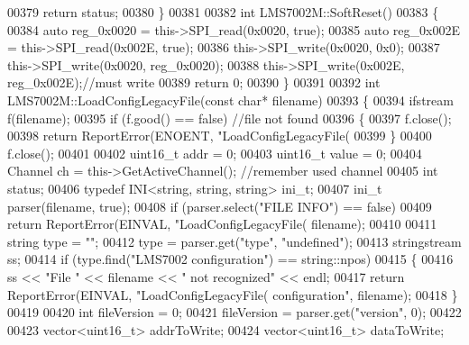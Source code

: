 \begin{DoxyCode}
00379     \textcolor{keywordflow}{return} status;
00380 \}
00381 
00382 \textcolor{keywordtype}{int} LMS7002M::SoftReset()
00383 \{
00384     \textcolor{keyword}{auto} reg\_0x0020 = this->SPI_read(0x0020, \textcolor{keyword}{true});
00385     \textcolor{keyword}{auto} reg\_0x002E = this->SPI_read(0x002E, \textcolor{keyword}{true});
00386     this->SPI_write(0x0020, 0x0);
00387     this->SPI_write(0x0020, reg\_0x0020);
00388     this->SPI_write(0x002E, reg\_0x002E);\textcolor{comment}{//must write}
00389     \textcolor{keywordflow}{return} 0;
00390 \}
00391 
00392 \textcolor{keywordtype}{int} LMS7002M::LoadConfigLegacyFile(\textcolor{keyword}{const} \textcolor{keywordtype}{char}* filename)
00393 \{
00394     ifstream f(filename);
00395     \textcolor{keywordflow}{if} (f.good() == \textcolor{keyword}{false}) \textcolor{comment}{//file not found}
00396     \{
00397         f.close();
00398         \textcolor{keywordflow}{return} ReportError(ENOENT, \textcolor{stringliteral}{"LoadConfigLegacyFile(%
00399     \}
00400     f.close();
00401 
00402     uint16\_t addr = 0;
00403     uint16\_t value = 0;
00404     Channel ch = this->GetActiveChannel(); \textcolor{comment}{//remember used channel}
00405     \textcolor{keywordtype}{int} status;
00406     \textcolor{keyword}{typedef} INI<string, string, string> ini\_t;
00407     ini\_t parser(filename, \textcolor{keyword}{true});
00408     \textcolor{keywordflow}{if} (parser.select(\textcolor{stringliteral}{"FILE INFO"}) == \textcolor{keyword}{false})
00409         \textcolor{keywordflow}{return} ReportError(EINVAL, \textcolor{stringliteral}{"LoadConfigLegacyFile(%
      filename);
00410 
00411     \textcolor{keywordtype}{string} type = \textcolor{stringliteral}{""};
00412     type = parser.get(\textcolor{stringliteral}{"type"}, \textcolor{stringliteral}{"undefined"});
00413     stringstream ss;
00414     \textcolor{keywordflow}{if} (type.find(\textcolor{stringliteral}{"LMS7002 configuration"}) == string::npos)
00415     \{
00416         ss << \textcolor{stringliteral}{"File "} << filename << \textcolor{stringliteral}{" not recognized"} << endl;
00417         \textcolor{keywordflow}{return} ReportError(EINVAL, \textcolor{stringliteral}{"LoadConfigLegacyFile(%
       configuration"}, filename);
00418     \}
00419 
00420     \textcolor{keywordtype}{int} fileVersion = 0;
00421     fileVersion = parser.get(\textcolor{stringliteral}{"version"}, 0);
00422 
00423     vector<uint16\_t> addrToWrite;
00424     vector<uint16\_t> dataToWrite;
}}
\end{DoxyCode}
